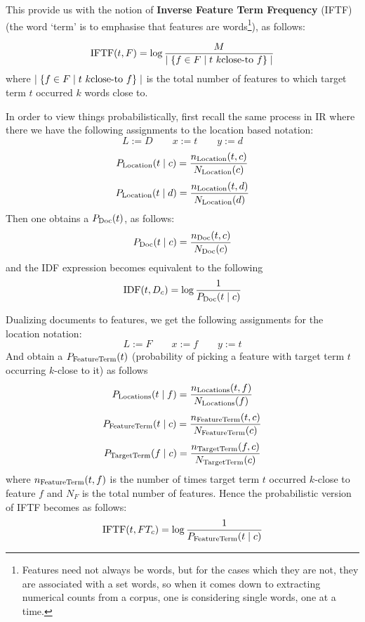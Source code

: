 This provide  us with the notion of {\bf Inverse Feature Term Frequency}  (IFTF)  (the word `term'  is to emphasise that features are words\footnote{Features need not always be words, but for the cases which they are not, they are associated with a set words, so when it comes down to extracting numerical counts from a corpus, one is considering single words, one at a time. }),   as follows:

\begin{equation}
\label{iftf}
\textmd{IFTF}(t, F) = \log{{M} \over {\mid \{f \in F \mid t  \ k\textmd{close-to} \ f \} \mid}}
\end{equation}
where $ \mid \{f \in F \mid t  \ k\textmd{close-to} \ f \} \mid$ is the total number of features to which target  term $t$ occurred $k$ words close to. 

In order to view things probabilistically, first recall the same process in IR where there we have the following assignments to the location based notation:
\[
L := D\qquad
x := t \qquad y := d
\]
\[
P_{\textmd{Location}}(t \mid c) =  \frac{n_{\textmd{Location}}(t,c)}{N_{\textmd{Location}}(c)} 
\]
\[
P_{\textmd{Location}}(t \mid d) =  \frac{n_{\textmd{Location}}(t,d)}{N_{\textmd{Location}}(d)} 
\]
Then one obtains  a $P_{\textmd{Doc}}(t)$,  as follows:
\[
P_{\textmd{Doc}}(t\mid c) = \frac{n_{\textmd{Doc}}(t,c)}{N_{\textmd{Doc}}(c)} 
\]
and the IDF expression becomes equivalent to the following 
\[
\textmd{IDF} (t, D_c) = \log{\frac{1}{P_{\textmd{Doc}}(t \mid c)}}
\]



Dualizing   documents   to  features,  we get the following assignments for the location notation:
\[
L := F \qquad
x := f\qquad
y := t
\]
And obtain a    $P_{\textmd{FeatureTerm}}(t)$ (probability of picking a feature with target term $t$ occurring $k$-close to it) as follows
\[
P_{\textmd{Locations}}(t \mid f) = \frac{n_{\textmd{Locations}}(t,f)}{N_{\textmd{Locations}} (f)} 
\]
\[
P_{\textmd{FeatureTerm}}(t \mid c) = \frac{n_{\textmd{FeatureTerm}}(t,c)}{N_{\textmd{FeatureTerm}} (c)} 
\]
\[
P_{\textmd{TargetTerm}}(f \mid c) = \frac{n_{\textmd{TargetTerm}}(f,c)}{N_{\textmd{TargetTerm}} (c)} 
\]
where $n_{\textmd{FeatureTerm}}(t,f)$ is the number of times target term $t$ occurred $k$-close to feature $f$ and $N_F$ is the total number of features. Hence the probabilistic version of IFTF becomes as follows:
\[
\textmd{IFTF}(t, FT_c) =  \log{\frac{1}{P_{\textmd{FeatureTerm}}(t \mid c)}}
\]

